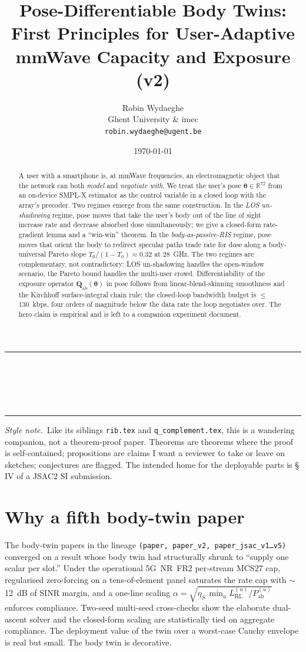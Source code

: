 \documentclass[11pt,a4paper]{article}
\title{\textbf{Pose-Differentiable Body Twins:\\
First Principles for User-Adaptive\\
mmWave Capacity and Exposure (v2)}}
\author{Robin Wydaeghe\\
 Ghent University \& imec\\
 \texttt{robin.wydaeghe@ugent.be}}
\date{\today}
\makeatletter
\theoremstyle{definition}
\newcommand{\Reals}{\mathbb{R}}
\newcommand{\Qabs}{\mathbf{Q}_{\mathrm{ab}}}
\newcommand{\thetab}{\bm{\theta}}
\newcommand{\Pabs}{P_{\mathrm{ab}}}
\renewcommand{\maketitle}{%
  \thispagestyle{plain}%
  \begin{center}
    \rule{\linewidth}{1pt}\\[0.4em]
    {\LARGE\bfseries \@title}\\[0.5em]
    {\large \@author}\\[0.3em]
    {\small \@date}\\[0.4em]\rule{\linewidth}{1pt}
  \end{center}
  \vspace{0.5em}
}
\makeatother
\begin{document}
\maketitle

\begin{abstract}
A user with a smartphone is, at mmWave frequencies, an electromagnetic
object that the network can both \emph{model} and \emph{negotiate
with}.  We treat the user's pose
$\thetab\in\Reals^{72}$ from an on-device SMPL-X estimator as the
control variable in a closed loop with the array's precoder.  Two
regimes emerge from the same construction.  In the \emph{LOS
un-shadowing} regime, pose moves that take the user's body out of
the line of sight increase rate and decrease absorbed dose
simultaneously; we give a closed-form rate-gradient lemma and a
``win-win'' theorem.  In the \emph{body-as-passive-RIS} regime, pose
moves that orient the body to redirect specular paths trade rate for
dose along a body-universal Pareto slope $T_0/(1-T_0)\approx 0.32$
at \SI{28}{GHz}.  The two regimes are complementary, not
contradictory: LOS un-shadowing handles the open-window scenario,
the Pareto bound handles the multi-user crowd.  Differentiability of
the exposure operator $\Qabs(\thetab)$ in pose follows from
linear-blend-skinning smoothness and the Kirchhoff surface-integral
chain rule; the closed-loop bandwidth budget is
$\le$\,\SI{130}{kbps}, four orders of magnitude below the data rate
the loop negotiates over.  The hero claim is empirical and is left
to a companion experiment document.
\end{abstract}

\vspace{0.3em}
\noindent\textit{Style note.}~Like its siblings
\texttt{rib.tex} and \texttt{q\_complement.tex}, this is a wandering
companion, not a theorem-proof paper.  Theorems are theorems where
the proof is self-contained; propositions are claims I want a
reviewer to take or leave on sketches; conjectures are flagged.
The intended home for the deployable parts is \S\,IV of a JSAC2 SI
submission.

\tableofcontents
\bigskip

\section{Why a fifth body-twin paper}\label{sec:why}

The body-twin papers in the lineage \texttt{(paper, paper\_v2,
paper\_jsac\_v1\dots v5)} converged on a result whose body twin had
structurally shrunk to ``supply one scalar per slot.''  Under the
operational \mbox{5G NR FR2} per-stream MCS27 cap, regularised
zero-forcing on a tens-of-element panel saturates the rate cap
with $\sim$\SI{12}{dB} of SINR margin, and a one-line scaling
$\alpha=\sqrt{\eta_S\,\min_u L_{\mathrm{RL}}^{(u)}/\Pabs^{(u)}}$
enforces compliance.  Two-seed multi-seed cross-checks show the
elaborate dual-ascent solver and the closed-form scaling are
statistically tied on aggregate compliance.  The deployment value
of the twin over a worst-case Cauchy envelope is real but small.
The body twin is decorative.
\end{document}
